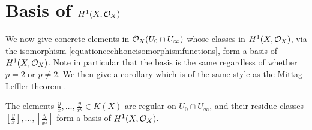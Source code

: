 \section{Basis of $H^1(X,\mathcal{O}_X)$}

We now give concrete elements in ${\cal O}_X(U_0 \cap U_\infty)$ whose classes in $H^1(X,\mathcal{O}_X)$, via the isomorphism \eqref{equationcechhoneisomorphismfunctions}, form a basis of $H^1(X,\mathcal{O}_X)$.
Note in particular that the basis is the same regardless of whether $p=2$ or $p\neq 2$.
We then give a corollary which is of the same style as the Mittag-Leffler theorem \cite[Chap.\ 5, \S 2, Thm.\ 4]{ahlfors}.

    \begin{thm}\label{theorembasisofhone}
    The elements $\frac{y}{x}, \ldots, \frac{y}{x^g} \in K(X)$ are regular on $U_0 \cap U_\infty$, and their residue classes $\left [ \frac{y}{x} \right ],  \ldots, \left [ \frac{y}{x^g} \right]$ form a basis of $H^1(X,\mathcal{O}_X)$.
    \end{thm}
